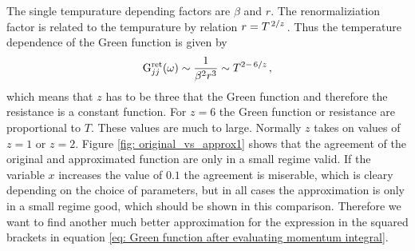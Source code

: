 %
The single tempurature depending factors are $\beta$ and $r$.
The renormaliziation factor is related to the tempurature by relation $r = T^{\left.2\middle\slash z\right.}$.
Thus the temperature dependence of the Green function is given by
%
\begin{align}
	\mathrm{G}_{jj}^{\mathrm{ret}}(\omega) \sim \frac{1}{\beta^{2} r^{3}} \sim T^{2-\left.6\middle\slash z\right.},
\end{align}
%
which means that $z$ has to be three that the Green function and therefore the resistance is a constant function.
For $z=6$ the Green function or resistance are proportional to $T$.
These values are much to large.
Normally $z$ takes on values of $z=1$ or $z=2$.
Figure \ref{fig: original_vs_approx1} shows that the agreement of the original and approximated function are only in a small regime valid.
If the variable $x$ increases the value of $0.1$ the agreement is miserable, which is cleary depending on the choice of parameters, but in all cases the approximation is only in a small regime good, which should be shown in this comparison.
Therefore we want to find another much better approximation for the expression in the squared brackets in equation \eqref{eq: Green function after evaluating momentum integral}.

